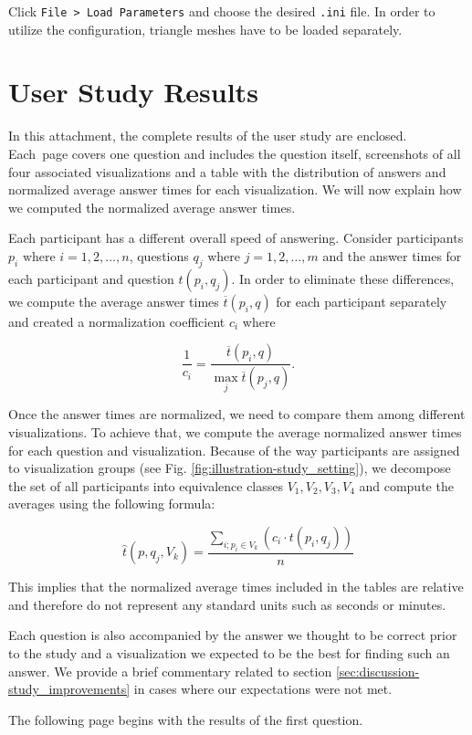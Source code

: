 Click \verb+File > Load Parameters+ and choose the desired \verb+.ini+ file. In order to utilize the configuration, triangle meshes have to be loaded separately.

\clearpage

\section{User Study Results}
\label{attch:complete_study_results}

In this attachment, the complete results of the user study are enclosed. Each~page covers one question and includes the question itself, screenshots of all four associated visualizations and a table with the distribution of answers and normalized average answer times for each visualization. We will now explain how we computed the normalized average answer times.

Each participant has a different overall speed of answering. Consider participants \(p_i \text{ where } i = 1, 2, \dotsc, n\), questions \(q_j \text{ where } j = 1, 2, \dotsc, m\) and the answer times for each participant and question \(t(p_i,q_j)\). In order to eliminate these differences, we compute the average answer times \(\overline{t}(p_i,q)\) for each participant separately and created a normalization coefficient \(c_i\) where

\[\frac{1}{c_i} = \frac{\overline{t}(p_i,q)}{{\max_{j} \overline{t}(p_j,q)}}.\] 

Once the answer times are normalized, we need to compare them among different visualizations. To achieve that, we compute the average normalized answer times for each question and visualization. Because of the way participants are assigned to visualization groups (see Fig. \ref{fig:illustration-study_setting}), we decompose the set of all participants into equivalence classes \(V_1,V_2,V_3,V_4\) and compute the averages using the following formula:

\[\widehat{t}(p,q_j,V_k) = \frac{\sum_{i; p_i \in V_k}^{}(c_i \cdot t(p_i,q_j))}{n}\]

This implies that the normalized average times included in the tables are relative and therefore do not represent any standard units such as seconds or minutes.

Each question is also accompanied by the answer we thought to be correct prior to the study and a visualization we expected to be the best for finding such an answer. We provide a brief commentary related to section \ref{sec:discussion-study_improvements} in cases where our expectations were not met.

The following page begins with the results of the first question.
\clearpage

